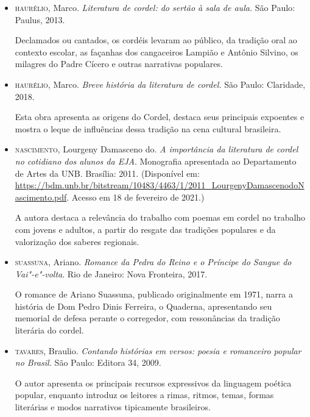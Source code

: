 \documentclass[12pt]{extarticle}
\begin{document}
\begin{itemize}
\item \textsc{haurélio}, Marco. \textit{Literatura de cordel: do sertão à sala
  de aula.} São Paulo: Paulus, 2013.

Declamados ou cantados, os cordéis levaram ao público, da tradição oral ao
contexto escolar, as façanhas dos cangaceiros Lampião e Antônio Silvino, os
milagres do Padre Cícero e outras narrativas populares.

\item \textsc{haurélio}, Marco. \textit{Breve história da literatura de
  cordel.} São Paulo: Claridade, 2018.

Esta obra apresenta as origens do Cordel, destaca seus principais expoentes
e mostra o leque de influências dessa tradição na cena cultural brasileira.

\item \textsc{nascimento}, Lourgeny Damasceno do. \textit{A importância da
  literatura de cordel no cotidiano dos alunos da EJA}. Monografia apresentada
  ao Departamento de Artes da UNB. Brasília: 2011. (Disponível em:
  \url{https://bdm.unb.br/bitstream/10483/4463/1/2011_LourgenyDamascenodoNascimento.pdf}.
  Acesso em 18 de fevereiro de 2021.)

A autora destaca a relevância do trabalho com poemas em cordel no trabalho com
jovens e adultos, a partir do resgate das tradições populares e da valorização
dos saberes regionais.

\item \textsc{suassuna}, Ariano. \textit{Romance da Pedra do Reino e o Príncipe
  do Sangue do Vai"-e"-volta}. Rio de Janeiro: Nova Fronteira, 2017.

O romance de Ariano Suassuna, publicado originalmente em 1971, narra a história
de Dom Pedro Dinis Ferreira, o Quaderna, apresentando seu memorial de defesa
perante o corregedor, com ressonâncias da tradição literária do cordel.

\item \textsc{tavares}, Braulio. \textit{Contando histórias em versos: poesia
  e romanceiro popular no Brasil.} São Paulo: Editora 34, 2009.

O autor apresenta os principais recursos expressivos da linguagem poética
popular, enquanto introduz os leitores a rimas, ritmos, temas, formas
literárias e modos narrativos tipicamente brasileiros.

\end{itemize}
\end{document}

